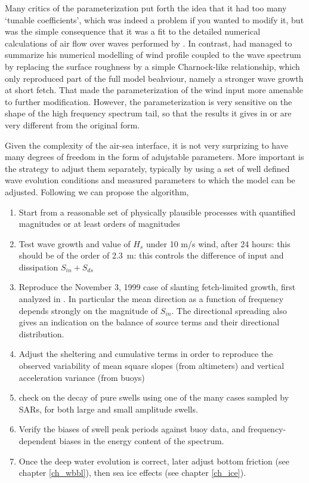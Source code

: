 Many critics of the \cite{Tolman&Chalikov1996} parameterization put forth the idea that it had too many `tunable coefficients', which 
was indeed a problem if you wanted to modify it, but was the simple consequence that it was a fit to the detailed numerical calculations 
of air flow over waves performed by \cite{Chalikov1993}.  In contrast, \cite{Janssen1991} had managed to summarize his 
numerical modelling of wind profile coupled to the wave spectrum by replacing the surface roughness by a simple Charnock-like 
relationship, which only reproduced part of the full model beahviour, namely a stronger wave growth at short fetch. 
That made the \cite{Janssen1991} parameterization of the wind input more amenable to further modification. However, the \cite{Janssen1991} parameterization
is very sensitive on the shape of the high frequency spectrum tail, so that 
the results it gives in \cite{Banner&Morison2006} or \cite{Ardhuin&al.2010} are very different from the original form. 

Given the complexity of the air-sea interface, it is not very surprizing to have many degrees of freedom in the form
of adujstable parameters. More important is the strategy to adjust them separately, typically by using a set of well defined 
wave evolution conditions and measured parameters to which the model can be adjusted. Following  \cite{Ardhuin&al.2010} we can propose the algorithm, 
\begin{enumerate}
 \item Start from a reasonable set of physically plausible processes with quantified magnitudes or at least orders of magnitudes
 \item Test wave growth and value of $H_s$ under 10 m/s wind, after 24 hours: this should be of the order of 2.3~m: this controls the difference 
 of input and dissipation $S_{in}+S_{ds}$
 \item Reproduce the November 3, 1999 case of slanting fetch-limited growth, first analyzed in \cite{Ardhuin&al.2007}. In particular the mean direction 
 as a function of frequency depends strongly on the magnitude of $S_{in}$. The directional spreading also gives an indication on the balance of source 
 terms and their directional distribution.
 \item Adjust the sheltering and cumulative terms in order to reproduce the observed variability of mean square slopes (from altimeters) and 
 vertical acceleration variance (from buoys) 
 \item check on the decay of pure swells using one of the many cases sampled by SARs, for both large and small amplitude swells.
 \item Verify the biases of swell peak periods against buoy data, and frequency-dependent biases in the energy content of the spectrum.
 \item Once the deep water evolution is correct, later adjust bottom friction (see chapter \ref{ch_wbbl}), then sea ice effects (see chapter \ref{ch_ice}). 
\end{enumerate}


